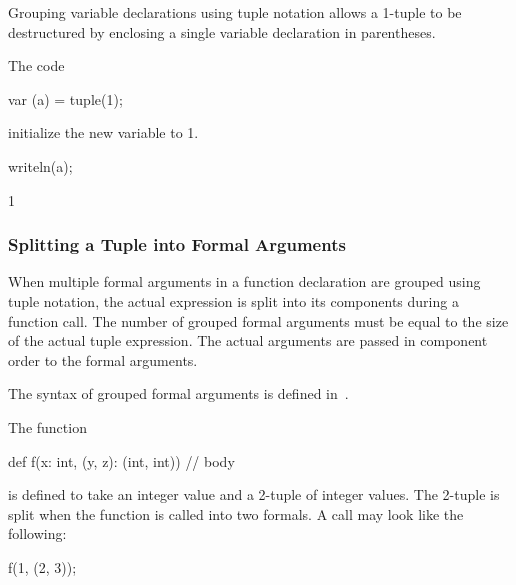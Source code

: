 Grouping variable declarations using tuple notation allows a 1-tuple
to be destructured by enclosing a single variable declaration in
parentheses.
\begin{example}
\begin{chapelpre}
\end{chapelpre}
The code
\begin{chapel}
var (a) = tuple(1);
\end{chapel}
initialize the new variable  to 1.
\begin{chapelpost}
writeln(a);
\end{chapelpost}
\begin{chapeloutput}
1
\end{chapeloutput}
\end{example}

\subsubsection{Splitting a Tuple into Formal Arguments}
\label{Formal_Argument_Declarations_in_a_Tuple}

When multiple formal arguments in a function declaration are grouped
using tuple notation, the actual expression is split into its
components during a function call.  The number of grouped formal
arguments must be equal to the size of the actual tuple expression.
The actual arguments are passed in component order to the formal
arguments.

The syntax of grouped formal arguments is defined
in~.

\begin{example}
\begin{chapelpre}
\end{chapelpre}
The function
\begin{chapel}
def f(x: int, (y, z): (int, int)) {
  // body
}
\end{chapel}
is defined to take an integer value and a 2-tuple of integer values.
The 2-tuple is split when the function is called into two formals.  A
call may look like the following:
\begin{chapel}
f(1, (2, 3));
\end{chapel}
\begin{chapelpost}
\end{chapelpost}
\begin{chapeloutput}
\end{chapeloutput}
\end{example}

